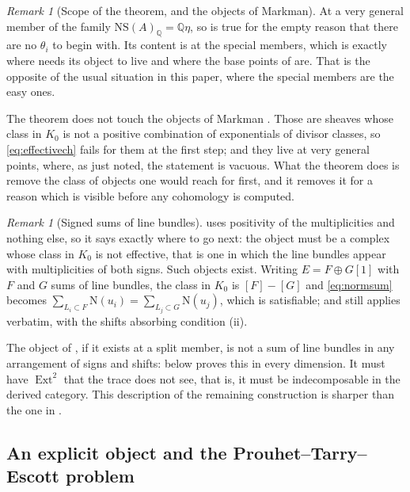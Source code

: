 \documentclass[11pt,reqno]{amsart}
\theoremstyle{plain}
\theoremstyle{definition}
\theoremstyle{remark}
\newtheorem{remark}[theorem]{Remark}
\newcommand{\QQ}{\mathbb{Q}}
\newcommand{\NS}{\mathrm{NS}}
\newcommand{\Nm}{\mathrm{N}}             %
\DeclareMathOperator{\Ext}{Ext}
\begin{document}
\begin{remark}[Scope of the theorem, and the objects of
Markman]\label{rem:markmanpositivity}
At a very general member of the family $\NS(A)_{\QQ}=\QQ\eta$, so
 is true for the empty reason that there are no
$\theta_{i}$ to begin with. Its content is at the special members, which is
exactly where  needs its object to live and where the
base points of \cite[Theorem~15.27]{paperI} are. That is the opposite of the usual
situation in this paper, where the special members are the easy ones.

The theorem does not touch the objects of Markman \cite{Mar25a,Mar25b}.
Those are sheaves whose class in $K_{0}$ is not a positive combination of
exponentials of divisor classes, so \eqref{eq:effectivech} fails for them at
the first step; and they live at very general points, where, as just noted,
the statement is vacuous. What the theorem does is remove the class of
objects one would reach for first, and it removes it for a reason which is
visible before any cohomology is computed.
\end{remark}

\begin{remark}[Signed sums of line bundles]
\label{rem:whatitmustbe}
 uses positivity of the multiplicities and nothing else,
so it says exactly where to go next: the object must be a complex whose
class in $K_{0}$ is not effective, that is one in which the line bundles
appear with multiplicities of both signs. Such objects exist. Writing
$E=F\oplus G[1]$ with $F$ and $G$ sums of line bundles, the class in $K_{0}$
is $[F]-[G]$ and \eqref{eq:normsum} becomes
$\sum_{L_{i}\subset F}\Nm(u_{i})=\sum_{L_{j}\subset G}\Nm(u_{j})$, which is
satisfiable; and  still applies verbatim, with the
shifts absorbing condition (ii).

The object of , if it exists at a split member, is
not a sum of line bundles in any arrangement of signs and shifts:
 below proves this in every dimension. It must have
$\Ext^{2}$ that the trace does not see, that is, it must be indecomposable in
the derived category. This description of the remaining construction is
sharper than the one in .
\end{remark}

\subsection{An explicit object and the Prouhet--Tarry--Escott problem}
\label{ssec:pte}
\end{document}
